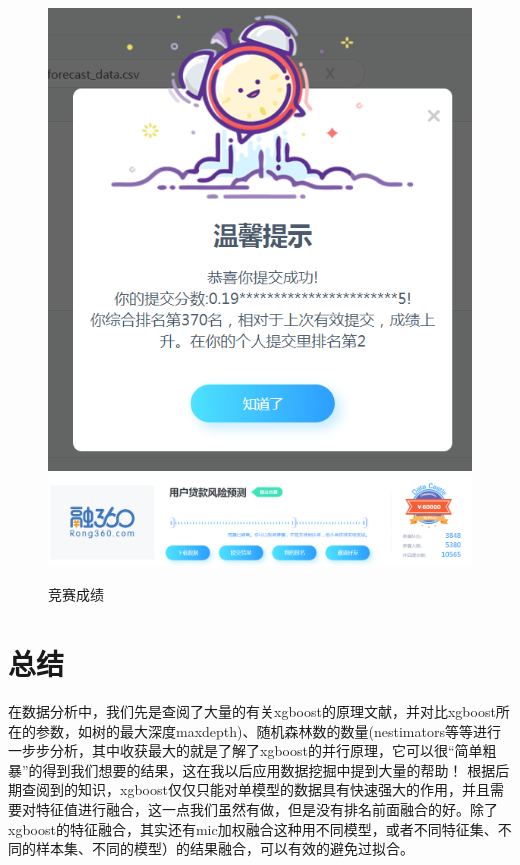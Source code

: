 \documentclass{article}
\begin{document}
\begin{figure}[h]
\includegraphics[scale=0.5]{十一}
\includegraphics[scale=0.5]{十二}
\caption{竞赛成绩}

\end{figure}

\section{总结}
在数据分析中，我们先是查阅了大量的有关xgboost的原理文献，并对比xgboost所在的参数，如树的最大深度max\textunderscore depth)、随机森林数的数量(n\textunderscore estimators等等进行一步步分析，其中收获最大的就是了解了xgboost的并行原理，它可以很“简单粗暴”的得到我们想要的结果，这在我以后应用数据挖掘中提到大量的帮助！
根据后期查阅到的知识，xgboost仅仅只能对单模型的数据具有快速强大的作用，并且需要对特征值进行融合，这一点我们虽然有做，但是没有排名前面融合的好。除了xgboost的特征融合，其实还有mic加权融合这种用不同模型，或者不同特征集、不同的样本集、不同的模型）的结果融合，可以有效的避免过拟合。
\end{document}
